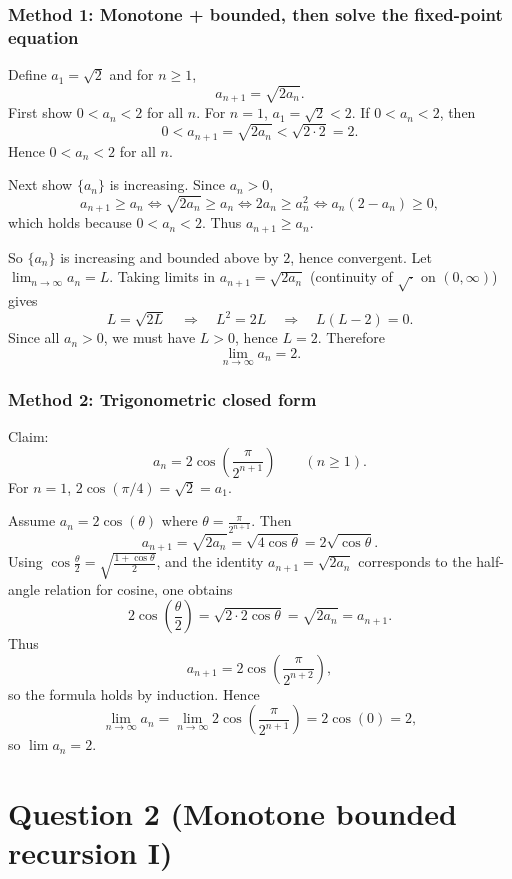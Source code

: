 \documentclass[12pt]{article}
\begin{document}
\subsubsection*{Method 1: Monotone + bounded, then solve the fixed-point equation}

Define \(a_1=\sqrt{2}\) and for \(n\ge 1\),
\[
a_{n+1}=\sqrt{2a_n}.
\]
First show \(0<a_n<2\) for all \(n\). For \(n=1\), \(a_1=\sqrt{2}<2\). If \(0<a_n<2\), then
\[
0<a_{n+1}=\sqrt{2a_n}<\sqrt{2\cdot 2}=2.
\]
Hence \(0<a_n<2\) for all \(n\).

Next show \(\{a_n\}\) is increasing. Since \(a_n>0\),
\[
a_{n+1}\ge a_n
\iff \sqrt{2a_n}\ge a_n
\iff 2a_n \ge a_n^2
\iff a_n(2-a_n)\ge 0,
\]
which holds because \(0<a_n<2\). Thus \(a_{n+1}\ge a_n\).

So \(\{a_n\}\) is increasing and bounded above by \(2\), hence convergent. Let \(\lim_{n\to\infty} a_n=L\). Taking limits in \(a_{n+1}=\sqrt{2a_n}\) (continuity of \(\sqrt{\cdot}\) on \((0,\infty)\)) gives
\[
L=\sqrt{2L}\quad\Rightarrow\quad L^2=2L\quad\Rightarrow\quad L(L-2)=0.
\]
Since all \(a_n>0\), we must have \(L>0\), hence \(L=2\). Therefore
\[
\boxed{\lim_{n\to\infty} a_n = 2.}
\]

\subsubsection*{Method 2: Trigonometric closed form}

Claim:
\[
a_n = 2\cos\left(\frac{\pi}{2^{n+1}}\right)\qquad (n\ge 1).
\]
For \(n=1\), \(2\cos(\pi/4)=\sqrt{2}=a_1\).

Assume \(a_n = 2\cos(\theta)\) where \(\theta=\frac{\pi}{2^{n+1}}\). Then
\[
a_{n+1}=\sqrt{2a_n}=\sqrt{4\cos\theta}=2\sqrt{\cos\theta}.
\]
Using \(\cos\frac{\theta}{2}=\sqrt{\frac{1+\cos\theta}{2}}\), and the identity \(a_{n+1}=\sqrt{2a_n}\) corresponds to the half-angle relation for cosine, one obtains
\[
2\cos\left(\frac{\theta}{2}\right)=\sqrt{2\cdot 2\cos\theta}=\sqrt{2a_n}=a_{n+1}.
\]
Thus
\[
a_{n+1}=2\cos\left(\frac{\pi}{2^{n+2}}\right),
\]
so the formula holds by induction. Hence
\[
\lim_{n\to\infty} a_n
= \lim_{n\to\infty} 2\cos\left(\frac{\pi}{2^{n+1}}\right)
=2\cos(0)=2,
\]
so \(\boxed{\lim a_n=2}\).

\newpage


\section*{Question 2 (Monotone bounded recursion I)}
\end{document}
